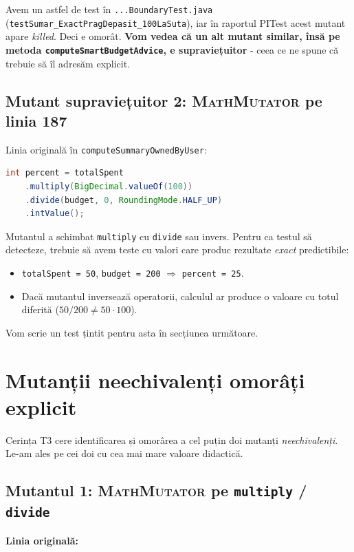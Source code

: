 Avem un astfel de test în \texttt{...BoundaryTest.java} (\texttt{testSumar\_ExactPragDepasit\_100LaSuta}), iar în raportul PITest acest mutant apare \textit{killed}. Deci e omorât. \textbf{Vom vedea că un alt mutant similar, însă pe metoda \texttt{computeSmartBudgetAdvice}, e supraviețuitor} - ceea ce ne spune că trebuie să îl adresăm explicit.

\subsection{Mutant supraviețuitor 2: \textsc{MathMutator} pe linia 187}

Linia originală în \texttt{computeSummaryOwnedByUser}:

\begin{lstlisting}[language=Java]
int percent = totalSpent
    .multiply(BigDecimal.valueOf(100))
    .divide(budget, 0, RoundingMode.HALF_UP)
    .intValue();
\end{lstlisting}

Mutantul a schimbat \texttt{multiply} cu \texttt{divide} sau invers. Pentru ca testul să detecteze, trebuie să avem teste cu valori care produc rezultate \textit{exact} predictibile:

\begin{itemize}
    \item \texttt{totalSpent = 50}, \texttt{budget = 200} $\Rightarrow$ \texttt{percent = 25}.
    \item Dacă mutantul inversează operatorii, calculul ar produce o valoare cu totul diferită ($50/200 \neq 50 \cdot 100$).
\end{itemize}

Vom scrie un test țintit pentru asta în secțiunea următoare.

\section{Mutanții neechivalenți omorâți explicit}
\label{sec:killed-mutants}

Cerința T3 cere identificarea și omorârea a cel puțin doi mutanți \textit{neechivalenți}. Le-am ales pe cei doi cu cea mai mare valoare didactică.

\subsection{Mutantul 1: \textsc{MathMutator} pe \texttt{multiply} / \texttt{divide}}

\textbf{Linia originală:}

